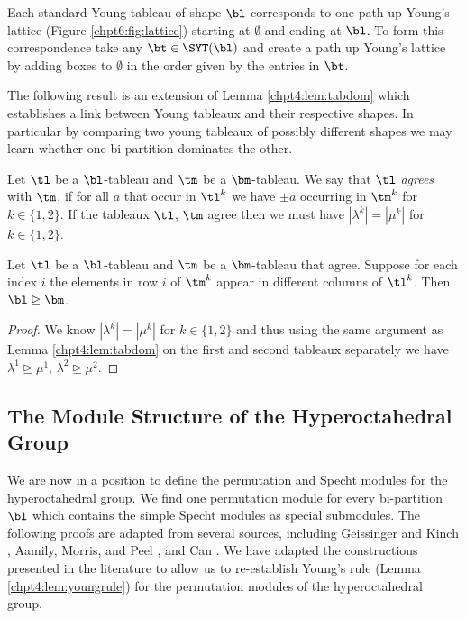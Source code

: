 \documentclass[11pt]{report}
\begin{document}
Each standard Young tableau of shape $\bl$ corresponds to one path up Young's lattice (Figure \ref{chpt6:fig:lattice}) starting at $\emptyset$ and ending at $\bl$. To form this correspondence take any $\bt \in \SYT(\bl)$ and create a path up Young's lattice by adding boxes to $\emptyset$ in the order given by the entries in $\bt$. 

The following result is an extension of Lemma \ref{chpt4:lem:tabdom} which establishes a link between Young tableaux and their respective shapes. In particular by comparing two young tableaux of possibly different shapes we may learn whether one bi-partition dominates the other.


\begin{defn}
	Let $\tl$ be a $\bl$-tableau and $\tm$ be a $\bm$-tableau. We say that $\tl$ 
	\emph{agrees} with $\tm$, if for all $a$ that occur in $\tl^{k}$ we have $\pm a$ occurring in $\tm^{k}$ for $k\in \{1,2\}$. If the tableaux $\tl$, $\tm$ agree then we must have $|\lambda^{k}| = |\mu^{k}|$ for $k\in\{1,2\}$.
\end{defn}

\begin{lemma}
	\label{chpt6:lem:tabdom}
	Let $\tl$ be a $\bl$-tableau and 
	$\tm$ be a $\bm$-tableau that agree. Suppose for each index $i$ the elements in row $i$ of $\tm^{k}$ appear in different columns of $\tl^{k}$. Then 
	$\bl \trianglerighteq \bm$. 
\end{lemma}

\begin{proof}
	We know $|\lambda^{k}| = |\mu^{k}|$ for $k \in \{1,2\}$ and thus using the 
	same argument as Lemma \ref{chpt4:lem:tabdom}  on the first and second tableaux separately we have $\lambda^{1} \trianglerighteq \mu^{1}$, $\lambda^{2} \trianglerighteq \mu^{2}$.
\end{proof}




\subsection{The Module Structure of the Hyperoctahedral Group}

We are now in a position to define the permutation and Specht modules for the hyperoctahedral group. We find one permutation module for every bi-partition $\bl$ which contains the simple Specht modules as special submodules. The following proofs are adapted from several sources, including Geissinger and Kinch \cite{geissinger1978representations}, Aamily, Morris, and Peel \cite{al1981representations}, and Can \cite{can1996representations}. We have adapted the constructions presented in the literature to allow us to re-establish Young's rule (Lemma \ref{chpt4:lem:youngrule}) for the permutation modules of the hyperoctahedral group.
\end{document}
